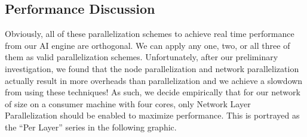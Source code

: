 \subsection*{Performance Discussion}
Obviously, all of these parallelization schemes to achieve real time performance from our AI engine are orthogonal.
We can apply any one, two, or all three of them as valid parallelization schemes.
Unfortunately, after our preliminary investigation, we found that the node parallelization and network parallelization actually result in more overheads than parallelization and we achieve a slowdown from using these techniques!
As such, we decide empirically that for our network of size on a consumer machine with four cores, only Network Layer Parallelization should be enabled to maximize performance.
This is portrayed as the ``Per Layer'' series in the following graphic.

